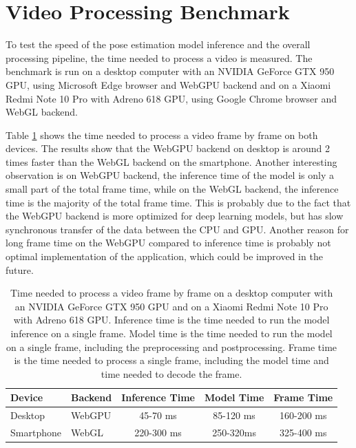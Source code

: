 \section{Video Processing Benchmark}
\label{speed_of_the_video_processing}
To test the speed of the pose estimation model inference and the overall processing pipeline, the time needed to process a video is measured. The benchmark is run on a desktop computer with an NVIDIA GeForce GTX 950 GPU, using Microsoft Edge browser and WebGPU backend and on a Xiaomi Redmi Note 10 Pro with Adreno 618 GPU, using Google Chrome browser and WebGL backend.

Table \ref{tab:video_processing_time} shows the time needed to process a video frame by frame on both devices. The results show that the WebGPU backend on desktop is around 2 times faster than the WebGL backend on the smartphone. Another interesting observation is on WebGPU backend, the inference time of the model is only a small part of the total frame time, while on the WebGL backend, the inference time is the majority of the total frame time. This is probably due to the fact that the WebGPU backend is more optimized for deep learning models, but has slow synchronous transfer of the data between the CPU and GPU. Another reason for long frame time on the WebGPU compared to inference time is probably not optimal implementation of the application, which could be improved in the future.

\begin{table}[htbp]
    \centering
    \begin{tabular}{l l  c c c}
        \toprule
        Device     & Backend & Inference Time & Model Time & Frame Time \\
        \midrule
        Desktop    & WebGPU  & 45-70 ms       & 85-120 ms  & 160-200 ms \\
        Smartphone & WebGL   & 220-300 ms     & 250-320ms  & 325-400 ms \\
        \bottomrule
    \end{tabular}
    \caption{Time needed to process a video frame by frame on a desktop computer with an NVIDIA GeForce GTX 950 GPU and on a Xiaomi Redmi Note 10 Pro with Adreno 618 GPU. Inference time is the time needed to run the model inference on a single frame. Model time is the time needed to run the model on a single frame, including the preprocessing and postprocessing. Frame time is the time needed to process a single frame, including the model time and time needed to decode the frame.}
    \label{tab:video_processing_time}
\end{table}


